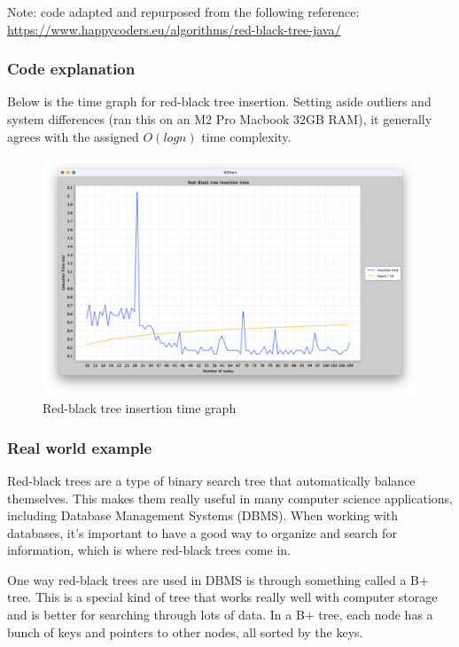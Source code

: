 \documentclass[10pt]{article}
\begin{document}
  \noindent
  Note: code adapted and repurposed from the following reference:
  \url{https://www.happycoders.eu/algorithms/red-black-tree-java/}

  \subsubsection*{Code explanation}


  Below is the time graph for red-black tree insertion. Setting aside outliers
  and system differences (ran this on an M2 Pro Macbook 32GB RAM), it generally agrees
  with the assigned $O(logn)$ time complexity.

  \newpage
  \vfill


  \begin{figure}[ht]
    \centering
    \includegraphics[width=1\textwidth]{complexity.png}
    \caption{Red-black tree insertion time graph}
    \label{fig:example}
  \end{figure}

  \subsubsection*{Real world example}


  Red-black trees are a type of binary search tree that automatically balance
  themselves. This makes them really useful in many computer science applications,
  including Database Management Systems (DBMS). When working with databases, it's
  important to have a good way to organize and search for information, which is where
  red-black trees come in.

  \spacing
  \noindent
  One way red-black trees are used in DBMS is through something called a B+ tree.
  This is a special kind of tree that works really well with computer storage and
  is better for searching through lots of data. In a B+ tree, each node has a
  bunch of keys and pointers to other nodes, all sorted by the keys.
\end{document}
